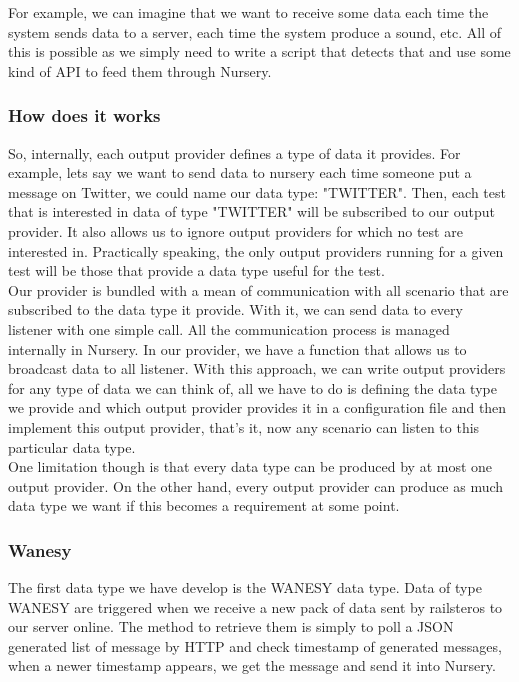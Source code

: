 \documentclass[12pt]{article}
\theoremstyle{definition}
\theoremstyle{definition}
\theoremstyle{remark}
\begin{document}
For example, we can imagine that we want to receive some data each time the system sends data to a server, each time the system produce a sound, etc. All of this is possible as we simply need to write a script that detects that and use some kind of API to feed them through Nursery.\\

\subsubsection{How does it works}

So, internally, each output provider defines a type of data it provides. For example, lets say we want to send data to nursery each time someone put a message on Twitter, we could name our data type: "TWITTER". Then, each test that is interested in data of type "TWITTER" will be subscribed to our output provider. It also allows us to ignore output providers for which no test are interested in. Practically speaking, the only output providers running for a given test will be those that provide a data type useful for the test.\\

Our provider is bundled with a mean of communication with all scenario that are subscribed to the data type it provide. With it, we can send data to every listener with one simple call. All the communication process is managed internally in Nursery.
In our provider, we have a function that allows us to broadcast data to all listener. With this approach, we can write output providers for any type of data we can think of, all we have to do is defining the data type we provide and which output provider provides it in a configuration file and then implement this output provider, that's it, now any scenario can listen to this particular data type.\\

One limitation though is that every data type can be produced by at most one output provider. On the other hand, every output provider can produce as much data type we want if this becomes a requirement at some point.\\

\subsubsection{Wanesy}

The first data type we have develop is the WANESY data type. Data of type WANESY are triggered when we receive a new pack of data sent by \gls{railsteros} to our server online. The method to retrieve them is simply to poll a JSON generated list of message by HTTP and check timestamp of generated messages, when a newer timestamp appears, we get the message and send it into Nursery.\\
\end{document}
